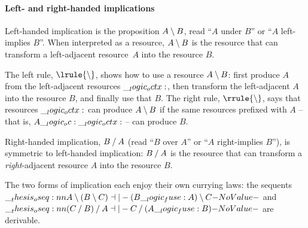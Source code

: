 \paragraph*{Left- and right-handed implications}
Left-handed implication is the proposition $A \mathbin { \setminus } B$, read \enquote{$A$ under $B$} or \enquote{$A$ left-implies $B$}.
When interpreted as a resource, $A \mathbin { \setminus } B$ is the resource that can transform a left-adjacent resource~$A$ into the resource $B$.
The left rule, $\lrule{\limp}$, shows how to use a resource $A \mathbin { \setminus } B$: first produce $A$ from the left-adjacent resources $\__logic_octx:$, then transform the left-adjacent $A$ into the resource $B$, and finally use that $B$.
The right rule, $\rrule{\limp}$, says that resources $\__logic_octx:$ can produce $A \mathbin { \setminus } B$ if the same resources prefixed with $A$ -- that is, $A \__logic_oc: \__logic_octx:$ -- can produce $B$.

Right-handed implication, $B \mathbin { / } A$ (read \enquote{$B$ over $A$} or \enquote{$A$ right-implies $B$}), is symmetric to left-handed implication: $B \mathbin { / } A$ is the resource that can transform a \emph{right}-adjacent resource $A$ into the resource $B$.

The two forms of implication each enjoy their own currying laws: the sequents $\oseq{A \limp (B \limp C) \dashv|- (B \fuse A) \limp C}$ and $\oseq{(C \pmir B) \pmir A \dashv|- C \pmir (A \fuse B)}$ are derivable.



